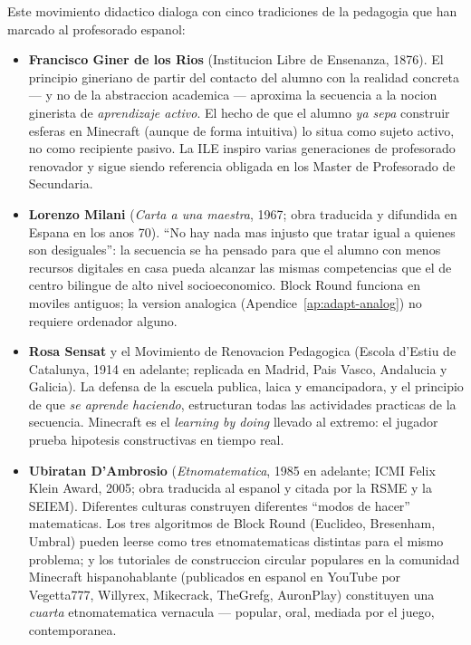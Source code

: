 \documentclass[12pt,a4paper]{scrartcl}
\newcommand{\acc}[1]{\textcolor{accent}{\textbf{#1}}}
\begin{document}
Este movimiento didactico dialoga con cinco tradiciones de la pedagogia que han marcado al profesorado espanol:

\begin{itemize}[leftmargin=1.3em,itemsep=0.2em,topsep=0.3em]
  \item \acc{Francisco Giner de los Rios} (Institucion Libre de Ensenanza, 1876). El principio gineriano de partir del contacto del alumno con la realidad concreta --- y no de la abstraccion academica --- aproxima la secuencia a la nocion ginerista de \emph{aprendizaje activo}. El hecho de que el alumno \emph{ya sepa} construir esferas en Minecraft (aunque de forma intuitiva) lo situa como sujeto activo, no como recipiente pasivo. La ILE inspiro varias generaciones de profesorado renovador y sigue siendo referencia obligada en los Master de Profesorado de Secundaria.

  \item \acc{Lorenzo Milani} (\emph{Carta a una maestra}, 1967; obra traducida y difundida en Espana en los anos 70). \enquote{No hay nada mas injusto que tratar igual a quienes son desiguales}: la secuencia se ha pensado para que el alumno con menos recursos digitales en casa pueda alcanzar las mismas competencias que el de centro bilingue de alto nivel socioeconomico. Block Round funciona en moviles antiguos; la version analogica (Apendice~\ref{ap:adapt-analog}) no requiere ordenador alguno.

  \item \acc{Rosa Sensat} y el Movimiento de Renovacion Pedagogica (Escola d'Estiu de Catalunya, 1914 en adelante; replicada en Madrid, Pais Vasco, Andalucia y Galicia). La defensa de la escuela publica, laica y emancipadora, y el principio de que \emph{se aprende haciendo}, estructuran todas las actividades practicas de la secuencia. Minecraft es el \emph{learning by doing} llevado al extremo: el jugador prueba hipotesis constructivas en tiempo real.

  \item \acc{Ubiratan D'Ambrosio} (\emph{Etnomatematica}, 1985 en adelante; ICMI Felix Klein Award, 2005; obra traducida al espanol y citada por la RSME y la SEIEM). Diferentes culturas construyen diferentes \enquote{modos de hacer} matematicas. Los tres algoritmos de Block Round (Euclideo, Bresenham, Umbral) pueden leerse como tres etnomatematicas distintas para el mismo problema; y los tutoriales de construccion circular populares en la comunidad Minecraft hispanohablante (publicados en espanol en YouTube por Vegetta777, Willyrex, Mikecrack, TheGrefg, AuronPlay) constituyen una \emph{cuarta} etnomatematica vernacula --- popular, oral, mediada por el juego, contemporanea.


\end{itemize}
\end{document}
